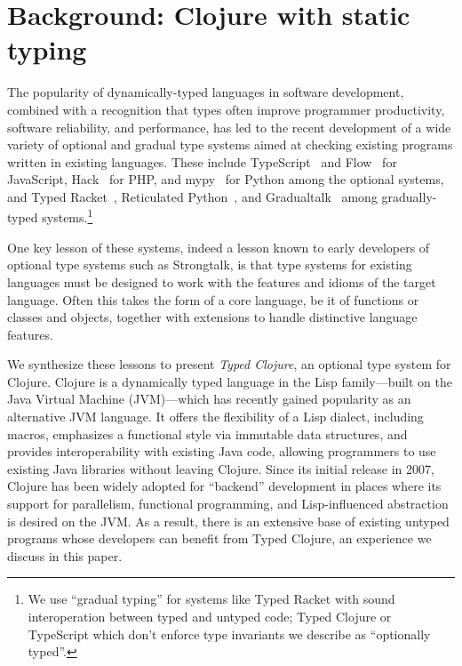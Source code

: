 \chapter{Background: Clojure with static typing}


The popularity of dynamically-typed languages in software
development, combined with a recognition that types often improve
programmer productivity, software reliability, and performance, has
led to the recent development of a wide variety of optional and
gradual type systems aimed at checking existing programs written in
existing languages.  These include  TypeScript~\cite{typescript} and Flow~\cite{flow} for
JavaScript, Hack~\cite{hack} for PHP, and mypy~\cite{mypy}
for Python among the optional systems, and Typed Racket~\cite{TF08}, Reticulated
Python~\cite{Vitousek14}, and Gradualtalk~\cite{gradualtalk} among gradually-typed systems.\footnote{We
  use ``gradual typing'' for systems like Typed Racket with sound
  interoperation between typed and untyped code; Typed Clojure or
 TypeScript which don't
  enforce type invariants we describe as ``optionally typed''.}

One key lesson of these systems, indeed a lesson known to early
developers of optional type systems such as Strongtalk, is that type
systems for existing languages must be designed to work with the
features and idioms of the target language. Often this takes the form
of a core language, be it of functions or classes and objects,
together with extensions to handle distinctive language features.


We synthesize these lessons to present \emph{Typed Clojure}, an
optional type system for Clojure. 
%
Clojure is a dynamically
typed language in the Lisp family---built on the Java Virtual
Machine (JVM)---which has recently gained popularity as an alternative
JVM language.  It offers the flexibility of a Lisp dialect, including
macros, emphasizes a functional style via
immutable data structures, and provides
interoperability with existing Java code, allowing programmers to use
existing Java libraries without leaving Clojure.
%
Since its initial release in 2007, Clojure has been widely adopted for
``backend'' development in places where its support for parallelism,
functional programming, and Lisp-influenced abstraction is desired on
the JVM. As a result, there is an extensive base of existing untyped
programs whose developers can benefit from Typed Clojure,
an experience we discuss in this paper.

